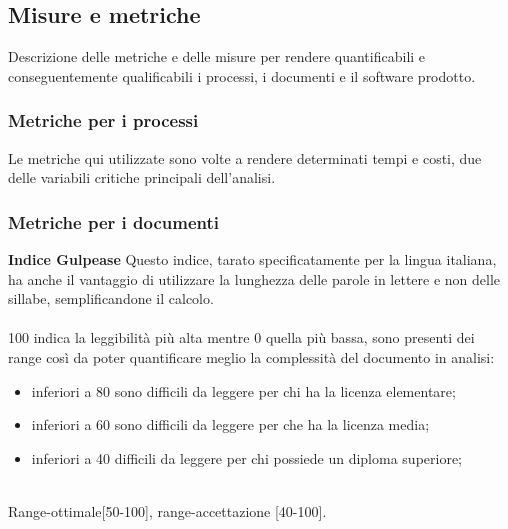%


\subsection{Misure e metriche}
Descrizione delle metriche e delle misure per rendere quantificabili e conseguentemente qualificabili i processi, i documenti e il software prodotto.
\subsubsection{Metriche per i processi}
Le metriche qui utilizzate sono volte a rendere determinati tempi e costi, due delle variabili critiche principali dell'analisi.
\subsubsection{Metriche per i documenti}
\textbf{Indice Gulpease} \textnormal{Questo indice, tarato specificatamente per la lingua italiana, ha anche il vantaggio di utilizzare la lunghezza delle parole in lettere e non delle sillabe, semplificandone il calcolo. }
\\
\\
100 indica la leggibilità più alta mentre 0 quella più bassa, sono presenti dei range così da poter quantificare meglio la complessità del documento in analisi:
\begin{itemize}
\item inferiori a 80 sono difficili da leggere per chi ha la licenza elementare;
\item inferiori a 60 sono difficili da leggere per che ha la licenza media;
\item inferiori a 40 difficili da leggere per chi possiede un diploma superiore;
\end{itemize}
\\
Range-ottimale[50-100], range-accettazione [40-100].

